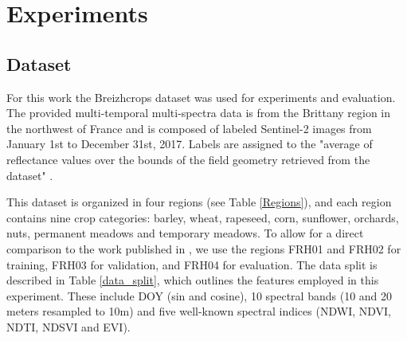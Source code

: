 \documentclass[journal,article,submit,pdftex,moreauthors]{Definitions/mdpi}
\begin{document}
\section{Experiments}
\subsection{Dataset}\label{dataset}
For this work the Breizhcrops dataset \cite{Russwurm2020} was used for experiments and evaluation. The provided multi-temporal multi-spectra data is from the Brittany region in the northwest of France and is composed of labeled Sentinel-2 images from January 1st to December 31st, 2017. Labels are assigned to the "average of reflectance values over the bounds of the field geometry retrieved from the dataset" \cite{Russwurm2020}.

This dataset is organized in four regions (see Table \ref{Regions}),
and each region contains nine crop categories: barley, wheat, rapeseed, corn, sunflower, orchards, nuts, permanent meadows and temporary meadows.
To allow for a direct comparison to the work published in \cite{Russwurm2020}, we use the regions FRH01 and FRH02 for training, FRH03 for validation, and FRH04 for evaluation.
The data split is described in Table \ref{data_split}, which outlines the features employed in this experiment. These include DOY (sin and cosine), 10 spectral bands (10 and 20 meters resampled to 10m) and five well-known spectral indices (NDWI, NDVI, NDTI, NDSVI and EVI).
\end{document}
